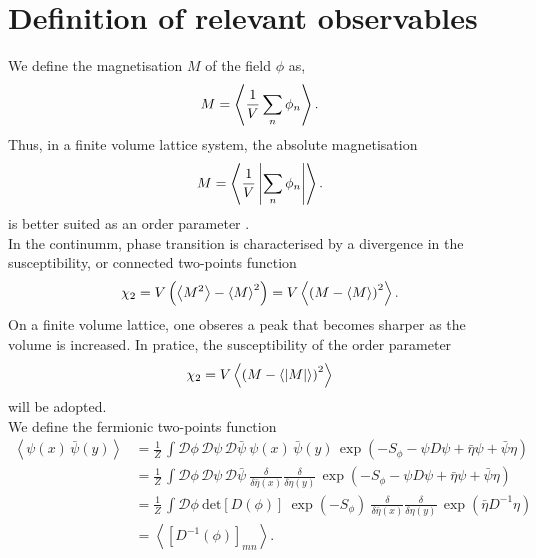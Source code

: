 \section{Definition of relevant observables}
\label{sec:observables}
We define the magnetisation $M$ of the field $\phi$ as,
\begin{equation*}
    M = \left\langle \frac{1}{V}\sum_n \phi_n \right\rangle.
\end{equation*}
Thus, in a finite volume lattice system, the absolute magnetisation
\begin{equation*}
    M = \left\langle \frac{1}{V}\left|\sum_n \phi_n\right| \right\rangle.
\end{equation*}
is better suited as an order parameter \cite{friedli_velenik_2017,gattringer_LQCD}. \\
In the continumm, phase transition is characterised by a divergence in the susceptibility, or connected two-points function
\begin{equation*}
    \chi_2 = V \left(\left\langle M^2 \right\rangle - \left\langle M \right\rangle^2\right) = V \left\langle \left(M-\left\langle M \right\rangle\right)^2 \right\rangle.
\end{equation*}
On a finite volume lattice, one obseres a peak that becomes sharper as the volume is increased. In pratice, the susceptibility of the order parameter 
\begin{equation*}
    \chi_2 = V \left\langle \left(M-\left\langle |M| \right\rangle\right)^2 \right\rangle
\end{equation*}
will be adopted. \\
We define the fermionic two-points function
\begin{equation} 
\begin{aligned}
    \left\langle \psi(x) \, \bar\psi(y) \right\rangle 
    &= \frac{1}{Z} \, \int \mathcal{D}\phi \, \mathcal{D}\psi \, \mathcal{D}\bar\psi \ \psi(x) \, \bar\psi(y) \, \exp \left( - S_\phi - \psi D \psi + \bar\eta \psi + \bar \psi \eta \right) \\
    &= \frac{1}{Z} \, \int \mathcal{D}\phi \, \mathcal{D}\psi \, \mathcal{D}\bar\psi \ \frac{\delta}{\delta \bar \eta(x)} \frac{\delta}{\delta \eta(y)} \, \exp \left( - S_\phi - \psi D \psi + \bar\eta \psi + \bar \psi \eta \right) \\
    &= \frac{1}{Z} \, \int \mathcal{D}\phi \ \text{det}\left[D(\phi)\right] \ \exp \left( - S_\phi \right) \ \frac{\delta}{\delta \bar \eta(x)} \frac{\delta}{\delta \eta(y)} \, \exp\left( \bar\eta D^{-1} \eta \right) \\
    &= \left\langle \left[D^{-1}(\phi)\right]_{mn}\right\rangle.
\end{aligned}
\label{eq:D_inv_condensate}
\end{equation}
